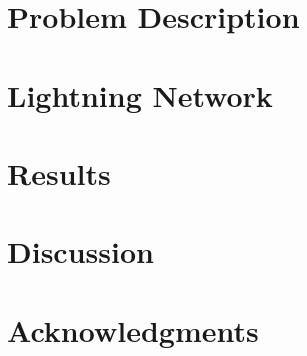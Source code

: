 \section{Problem Description}
    \label{sec:problem}
    

\clearpage

   
   
\clearpage
    
\clearpage

    \label{sec:scaling}
    
\clearpage
\section{Lightning Network}
    \label{sec:lightning:network}
    
\clearpage
    \label{sec:evaluation}
	
\clearpage
\section{Results}
\clearpage
\section{Discussion}
    \label{sec:discussion}
\clearpage
\section{Acknowledgments}
    \label{sec:acknowledgments}
